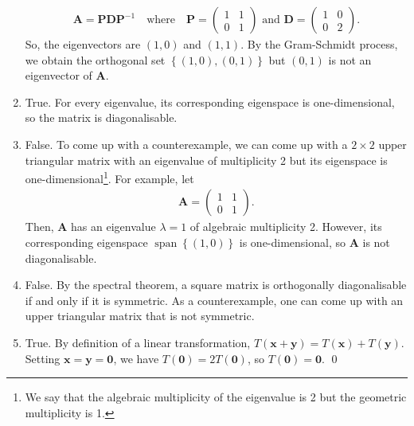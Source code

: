 \documentclass[12pt]{article}
\begin{document}
\begin{enumerate}[label=\textbf{(\alph*)}]
\begin{align*}
         \mathbf{A}=\mathbf{PDP}^{-1}\quad\text{where}\quad \mathbf{P}=\begin{pmatrix}
            1 & 1 \\ 0 & 1
         \end{pmatrix}\text{ and }\mathbf{D}=\begin{pmatrix}
             1 & 0 \\ 0 & 2 
         \end{pmatrix}.
     \end{align*}
     So, the eigenvectors are $\left(1,0\right)$ and $\left(1,1\right)$. By the Gram-Schmidt process, we obtain the orthogonal set $\left\{\left(1,0\right),\left(0,1\right)\right\}$ but $\left(0,1\right)$ is not an eigenvector of $\mathbf{A}$.
     \item True. For every eigenvalue, its corresponding eigenspace is one-dimensional, so the matrix is diagonalisable.
 \item False. To come up with a counterexample, we can come up with a $2\times 2$ upper triangular matrix with an eigenvalue of multiplicity 2 but its eigenspace is one-dimensional\footnote{We say that the algebraic multiplicity of the eigenvalue is 2 but the geometric multiplicity is 1.}. For example, let \begin{align*}
     \mathbf{A}=\begin{pmatrix}
         1 & 1 \\ 0 & 1
     \end{pmatrix}.
 \end{align*}
 Then, $\mathbf{A}$ has an eigenvalue $\lambda=1$ of algebraic multiplicity 2. However, its corresponding eigenspace $\operatorname{span}\left\{\left(1,0\right)\right\}$ is one-dimensional, so $\mathbf{A}$ is not diagonalisable.
  \item False. By the spectral theorem, a square matrix is orthogonally diagonalisable if and only if it is symmetric. As a counterexample, one can come up with an upper triangular matrix that is not symmetric.
     \item True. By definition of a linear transformation, $T(\mathbf{x}+\mathbf{y})=T(\mathbf{x})+T(\mathbf{y})$. Setting $\mathbf{x}=\mathbf{y}=\mathbf{0}$, we have $T(\mathbf{0})=2T(\mathbf{0})$, so $T(\mathbf{0})=\mathbf{0}$. \qed 
\end{enumerate}
\end{document}
